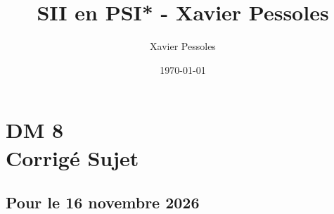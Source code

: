 \documentclass[
	fontsize=10pt, %
	twoside=false, %
]{kaobook}
\newcommand{\repRel}{../../../..}
\newcommand{\repStyle}{\repRel/Style}
\begin{document}

\titlehead{Document Template}
\title[SII en PSI* - Xavier Pessoles]{SII en PSI* - Xavier Pessoles}
\author[XP]{Xavier Pessoles}
\date{\today}

%
\frontmatter %


%
\mainmatter %


\setcounter{margintocdepth}{\sectiontocdepth}
\graphicspath{{\repStyle/png}}

\pagestyle{xp.scrheadings}



\newcommand{\repExo}{}
\newcommand{\nomExo}{}

\livretfalse %
\proffalse
\collefalse\colletrue
\normaltrue

\newcommand{\exer}{\subsection*}

\chapter*{DM 8 \\ 
\ifprof Corrigé \else Sujet \fi}


\section*{Pour le 16 novembre 2026}



\graphicspath{{\repStyle/png/}{../../../../Sujets_Concours/2005/EA_Plateau/images/}{../../../../Sujets_Concours/2015/CCMP_PSI_Lola/images/}}




\end{document}
